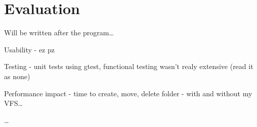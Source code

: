 \chapter{Evaluation}

Will be written after the program\ldots

Usability - ez pz

Testing - unit tests using gtest, functional testing wasn't realy extensive (read it as none)

Performance impact - time to create, move, delete folder - with and without my VFS\ldots

\ldots